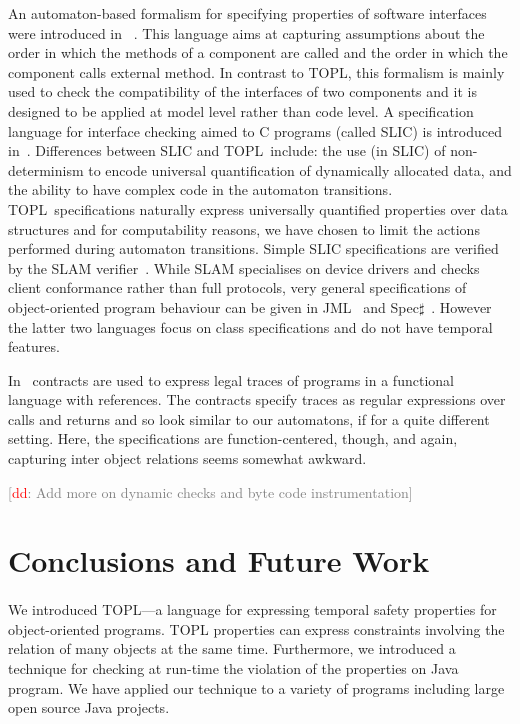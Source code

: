 \documentclass{llncs} %
\newcommand{\TPL}{TOPL}
\newcommand{\noterg}[2]{\textcolor{gray}{[\textcolor{red}{#1}: #2]}}
\newcommand{\dd}[1]{\noterg{dd}{#1}}
\newcommand{\dinocomment}[1]{\dd{#1}}
\begin{document}
An automaton-based formalism for specifying properties of software interfaces were introduced in~\cite{dblp:conf/sigsoft/AlfaroH01} . 
This language aims at capturing assumptions about the order in which the methods of a component are called and the order in which the component calls external method.
In contrast to \TPL, this formalism is mainly used to check the compatibility of the interfaces of two components and it is designed to be applied at  model level rather than code level. A specification language for interface checking aimed to C programs (called SLIC) is introduced in~\cite{ball2002}.  
Differences between SLIC and \TPL \ include: the use (in SLIC) of
non-determinism to encode universal quantification of dynamically allocated data, and the  ability to have complex code in the automaton transitions. 
\TPL \ specifications naturally express universally quantified
properties over data structures and for computability reasons,  we
have chosen to limit the  actions performed during automaton transitions. 
Simple SLIC specifications are verified by  the SLAM verifier~\cite{dblp:conf/cav/ballr01}.
While SLAM specialises on device drivers and checks client conformance rather than full protocols, 
very general specifications of object-oriented program behaviour can be given in JML~\cite{jml} and Spec$\sharp$~\cite{DBLP:journals/jot/BarnettDFLS04}. However the latter two languages focus on class specifications and do not have temporal features.

In~\cite{disney2011} contracts are used to express legal traces of
programs in a functional language with references. The contracts
specify traces as regular expressions over calls and returns and so
look similar to our automatons, if for a quite different
setting. Here, the specifications are function-centered, though, and
again, capturing inter object relations seems somewhat awkward.

\dinocomment{Add more on dynamic checks and byte code instrumentation}

\section{Conclusions and Future Work}\label{sec:conclusions} %

\paragraph{}
We introduced TOPL---a language for expressing temporal safety properties for object-oriented programs.
TOPL properties can express constraints involving the relation of many objects at the same time. 
Furthermore, we introduced a technique for checking at run-time the violation of the properties
on Java program. We have applied our technique to a variety of programs including large open source Java projects.
%
\end{document}
